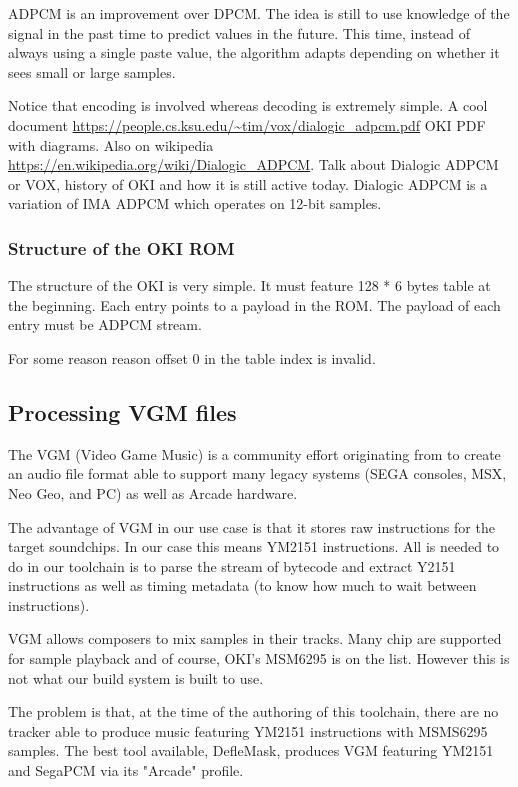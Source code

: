 ADPCM is an improvement over DPCM. The idea is still to use knowledge of the signal in the past time to predict values in the future. This time, instead of always using a single paste value, the algorithm adapts depending on whether it sees small or large samples.



Notice that encoding is involved whereas decoding is extremely simple. A cool document \url{https://people.cs.ksu.edu/~tim/vox/dialogic_adpcm.pdf} OKI PDF with diagrams. Also on wikipedia \url{https://en.wikipedia.org/wiki/Dialogic_ADPCM}. Talk about Dialogic ADPCM or VOX, history of OKI and how it is still active today. Dialogic ADPCM is a variation of IMA ADPCM which operates on 12-bit samples.




\subsubsection{Structure of the OKI ROM}
The structure of the OKI is very simple. It must feature 128 * 6 bytes table at the beginning. Each entry points to a payload in the ROM. The payload of each entry must be ADPCM stream.

For some reason reason offset 0 in the table index is invalid.

\subsection{Processing VGM files}
The VGM (Video Game Music) is a community effort originating from  to create an audio file format able to support many legacy systems (SEGA consoles, MSX, Neo Geo, and PC) as well as Arcade hardware.

The advantage of VGM in our use case is that it stores raw instructions for the target soundchips. In our case this means YM2151 instructions. All is needed to do in our toolchain is to parse the stream of bytecode and extract Y2151 instructions as well as timing metadata (to know how much to wait between instructions).

VGM allows composers to mix samples in their tracks. Many chip are supported for sample playback and of course, OKI's MSM6295 is on the list. However this is not what our build system is built to use.

The problem is that, at the time of the authoring of this toolchain, there are no tracker able to produce music featuring YM2151 instructions with MSMS6295 samples. The best tool available, DefleMask, produces VGM featuring YM2151 and SegaPCM via its "Arcade" profile.

